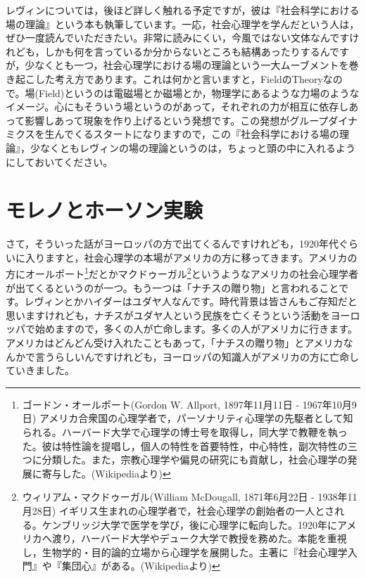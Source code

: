 \documentclass{ltjsbook}
\begin{document}
レヴィンについては，後ほど詳しく触れる予定ですが，彼は『社会科学における場の理論』\parencite{Lewin}という本も執筆しています。一応，社会心理学を学んだという人は，ぜひ一度読んでいただきたい。非常に読みにくい，今風ではない文体なんですけれども，しかも何を言っているか分からないところも結構あったりするんですが，少なくとも一つ，社会心理学における場の理論という一大ムーブメントを巻き起こした考え方であります。これは何かと言いますと，FieldのTheoryなので。場(Field)というのは電磁場とか磁場とか，物理学にあるような力場のようなイメージ。心にもそういう場というのがあって，それぞれの力が相互に依存しあって影響しあって現象を作り上げるという発想です。この発想がグループダイナミクスを生んでくるスタートになりますので，この『社会科学における場の理論』，少なくともレヴィンの場の理論というのは，ちょっと頭の中に入れるようにしておいてください。

\section{モレノとホーソン実験}
さて，そういった話がヨーロッパの方で出てくるんですけれども，1920年代ぐらいに入りますと，社会心理学の本場がアメリカの方に移ってきます。アメリカの方にオールポート\footnote{ゴードン・オールポート(Gordon W. Allport, 1897年11月11日 - 1967年10月9日)  アメリカ合衆国の心理学者で，パーソナリティ心理学の先駆者として知られる。ハーバード大学で心理学の博士号を取得し，同大学で教鞭を執った。彼は特性論を提唱し，個人の特性を首要特性，中心特性，副次特性の三つに分類した。また，宗教心理学や偏見の研究にも貢献し，社会心理学の発展に寄与した。(Wikipediaより)}だとかマクドゥーガル\footnote{ウィリアム・マクドゥーガル(William McDougall, 1871年6月22日 - 1938年11月28日)  イギリス生まれの心理学者で，社会心理学の創始者の一人とされる。ケンブリッジ大学で医学を学び，後に心理学に転向した。1920年にアメリカへ渡り，ハーバード大学やデューク大学で教授を務めた。本能を重視し，生物学的・目的論的立場から心理学を展開した。主著に『社会心理学入門』や『集団心』がある。(Wikipediaより)}というようなアメリカの社会心理学者が出てくるというのが一つ。もう一つは「ナチスの贈り物」と言われることです。レヴィンとかハイダーはユダヤ人なんです。時代背景は皆さんもご存知だと思いますけれども，ナチスがユダヤ人という民族を亡くそうという活動をヨーロッパで始めますので，多くの人が亡命します。多くの人がアメリカに行きます。アメリカはどんどん受け入れたこともあって，「ナチスの贈り物」とアメリカなんかで言うらしいんですけれども，ヨーロッパの知識人がアメリカの方に亡命していきました。
\end{document}
